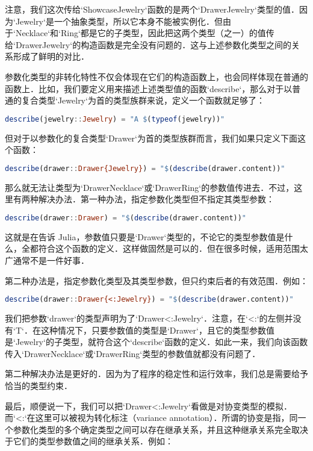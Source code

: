 注意，我们这次传给`Showcase{Jewelry}`函数的是两个`Drawer{Jewelry}`类型的值．因为`Jewelry`是一个抽象类型，所以它本身不能被实例化．但由于`Necklace`和`Ring`都是它的子类型，因此把这两个类型（之一）的值传给`Drawer{Jewelry}`的构造函数是完全没有问题的．这与上述参数化类型之间的关系形成了鲜明的对比．

参数化类型的非转化特性不仅会体现在它们的构造函数上，也会同样体现在普通的函数上．比如，我们要定义用来描述上述类型值的函数`describe`，那么对于以普通的复合类型`Jewelry`为首的类型族群来说，定义一个函数就足够了：

\begin{lstlisting}[language=julia]
describe(jewelry::Jewelry) = "A $(typeof(jewelry))"
\end{lstlisting}

但对于以参数化的复合类型`Drawer`为首的类型族群而言，我们如果只定义下面这个函数：

\begin{lstlisting}[language=julia]
describe(drawer::Drawer{Jewelry}) = "$(describe(drawer.content))"
\end{lstlisting}

那么就无法让类型为`Drawer{Necklace}`或`Drawer{Ring}`的参数值传进去．不过，这里有两种解决办法．第一种办法，指定参数化类型但不指定其类型参数：

\begin{lstlisting}[language=julia]
describe(drawer::Drawer) = "$(describe(drawer.content))"
\end{lstlisting}

这就是在告诉 Julia，参数值只要是`Drawer`类型的，不论它的类型参数值是什么，全都符合这个函数的定义．这样做固然是可以的．但在很多时候，适用范围太广通常不是一件好事．

第二种办法是，指定参数化类型及其类型参数，但只约束后者的有效范围．例如：

\begin{lstlisting}[language=julia]
describe(drawer::Drawer{<:Jewelry}) = "$(describe(drawer.content))"
\end{lstlisting}

我们把参数`drawer`的类型声明为了`Drawer{<:Jewelry}`．注意，在`<:`的左侧并没有`T`．在这种情况下，只要参数值的类型是`Drawer`，且它的类型参数值是`Jewelry`的子类型，就符合这个`describe`函数的定义．如此一来，我们向该函数传入`Drawer{Necklace}`或`Drawer{Ring}`类型的参数值就都没有问题了．

第二种解决办法是更好的．因为为了程序的稳定性和运行效率，我们总是需要给予恰当的类型约束．

最后，顺便说一下，我们可以把`Drawer{<:Jewelry}`看做是对协变类型的模拟．而`<:`在这里可以被视为转化标注（variance annotation）．所谓的协变是指，同一个参数化类型的多个确定类型之间可以存在继承关系，并且这种继承关系完全取决于它们的类型参数值之间的继承关系．例如：

